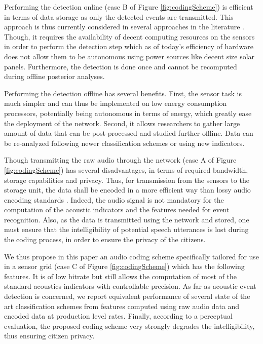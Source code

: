 \documentclass[sensors,article,submit,moreauthors,pdftex,10pt,a4paper]{mdpi}
\begin{document}
Performing the detection online (case B of Figure \ref{fig:codingScheme}) is efficient in terms of data storage as only the detected events are transmitted. This approach is thus currently considered in several approaches in the literature \cite{defreville2006automatic, mydlarz2017implementation, mydlarz2015design}. Though, it requires the availability of decent computing resources on the sensors in order to perform the detection step which as of today's efficiency of hardware does not allow them to be autonomous using power sources like decent size solar panels. Furthermore, the detection is done once and cannot be recomputed during offline posterior analyses.

Performing the detection offline has several benefits. First, the sensor task is much simpler and can thus be implemented on low energy consumption processors, potentially being autonomous in terms of energy, which greatly ease the deployment of the network. Second, it allows researchers to gather large amount of data that can be post-processed and studied further offline. Data can be re-analyzed following newer classification schemes or using new indicators.

Though transmitting the raw audio  through the network (case A of Figure \ref{fig:codingScheme}) has several disadvantages, in terms of required bandwidth, storage capabilities and privacy. Thus, for transmission from the sensors to the storage unit, the data shall be encoded in a more efficient way than lossy audio encoding standards \cite{pan1995tutorial}. Indeed, the audio signal is not mandatory for the computation of the acoustic indicators and the features needed for event recognition. Also, as the data is transmitted using the network and stored, one must ensure that the intelligibility of potential speech utterances is lost during the coding process, in order to ensure the privacy of the citizens.

We thus propose in this paper an audio coding scheme specifically tailored for use in a sensor grid (case C of Figure \ref{fig:codingScheme}) which has the following features. It is of low bitrate but still allows the computation of most of the standard acoustics indicators with controllable precision. As far as acoustic event detection is concerned, we report equivalent performance of several state of the art classification schemes from features computed using raw audio data and encoded data at production level rates. Finally, according to a perceptual evaluation, the proposed coding scheme very strongly degrades the intelligibility, thus ensuring citizen privacy.
\end{document}
